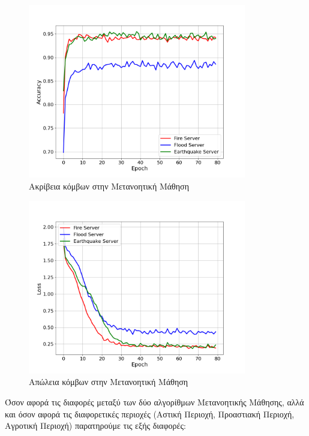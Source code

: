 \newpage

\begin{figure}[H]
    \centering
    \includegraphics[width=0.85\textwidth]{figures/chapter4/User_Accuracies.png}
    \caption{Ακρίβεια κόμβων στην Μετανοητική Μάθηση}
    \label{fig19}
\end{figure}

\begin{figure}[H]
    \centering
    \includegraphics[width=0.85\textwidth]{figures/chapter4/User_Losses.png}
    \caption{Απώλεια κόμβων στην Μετανοητική Μάθηση}
    \label{fig20}
\end{figure}

\newpage

Όσον αφορά τις διαφορές μεταξύ των δύο αλγορίθμων Μετανοητικής Μάθησης, αλλά και όσον αφορά τις διαφορετικές περιοχές (Αστική Περιοχή, Προαστιακή Περιοχή, Αγροτική Περιοχή) παρατηρούμε τις εξής διαφορές:

